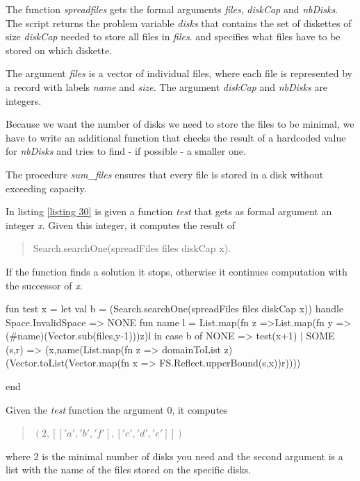 \documentclass[a4paper,halfparskip]{scrartcl}
\begin{document}
The function \emph{spreadfiles} gets the formal arguments \emph{files},
\emph{diskCap} and \emph{nbDisks}. The script returns the problem 
variable \emph{disks} that contains the set of diskettes of 
size \emph{diskCap} needed to store all files in \emph{files}. 
and specifies what files have to be stored on which diskette.

The argument \emph{files} is a vector of individual files, where each 
file is represented by a record with labels \emph{name} and \emph{size}. 
The argument \emph{diskCap} and \emph{nbDisks} are integers.

Because we want the number of disks we need to store the files
to be minimal, we have to write an additional function that checks
the result of a hardcoded value for \emph{nbDisks} and tries to find -
if possible - a smaller one.

The procedure \emph{sum\_files} ensures that every file is stored in
a disk without exceeding capacity.

In listing \ref{listing 30} is given a function \emph{test} that
gets as formal argument an integer \emph{x}. Given this integer, it
computes the result of
\begin{quote}
Search.searchOne(spreadFiles files diskCap x).
\end{quote}
If the function finds a solution it stops, otherwise it continues
computation with the successor of \emph{x}.
\begin{myverbatim}
fun test x =                        
  let 
     val b = (Search.searchOne(spreadFiles files diskCap x))
             handle Space.InvalidSpace => NONE
     fun name l = List.map(fn z =>List.map(fn y => 
                  (#name)(Vector.sub(files,y-1)))z)l
  in
     case b of NONE => test(x+1)
             | SOME (s,r) =>
               (x,name(List.map(fn z => domainToList z)
                  (Vector.toList(Vector.map(fn x =>
                     FS.Reflect.upperBound(s,x))r))))
     
  end
\end{myverbatim}


Given the \emph{test} function the argument 0, it computes
\begin{quote}
$(2, [['a','b','f' ], ['c','d','e' ]])$
\end{quote}
where 2 is the minimal number of disks you need and
the second argument is a list with the name of the files
stored on the specific disks.
\end{document}
